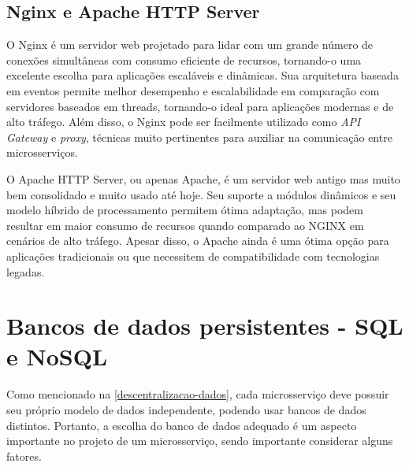 


\subsection{Nginx e Apache HTTP Server}
O Nginx é um servidor web projetado para lidar com um grande número de conexões simultâneas com consumo eficiente de recursos, tornando-o uma excelente escolha para aplicações escaláveis e dinâmicas. Sua arquitetura baseada em eventos permite melhor desempenho e escalabilidade em comparação com servidores baseados em threads, tornando-o ideal para aplicações modernas e de alto tráfego. Além disso, o Nginx pode ser facilmente utilizado como \emph{API Gateway} e \emph{proxy}, técnicas muito pertinentes para auxiliar na comunicação entre microsserviços. \cite{nginx}

O Apache HTTP Server, ou apenas Apache, é um servidor web antigo mas muito bem consolidado e muito usado até hoje. Seu suporte a módulos dinâmicos e seu modelo híbrido de processamento permitem ótima adaptação, mas podem resultar em maior consumo de recursos quando comparado ao NGINX em cenários de alto tráfego. Apesar disso, o Apache ainda é uma ótima opção para aplicações tradicionais ou que necessitem de compatibilidade com tecnologias legadas. \cite{nginx-vs-apache}


\section{Bancos de dados persistentes - SQL e NoSQL}
Como mencionado na \autoref{descentralizacao-dados}, cada microsserviço deve possuir seu próprio modelo de dados independente, podendo usar bancos de dados distintos. Portanto, a escolha do banco de dados adequado é um aspecto importante no projeto de um microsserviço, sendo importante considerar alguns fatores.

